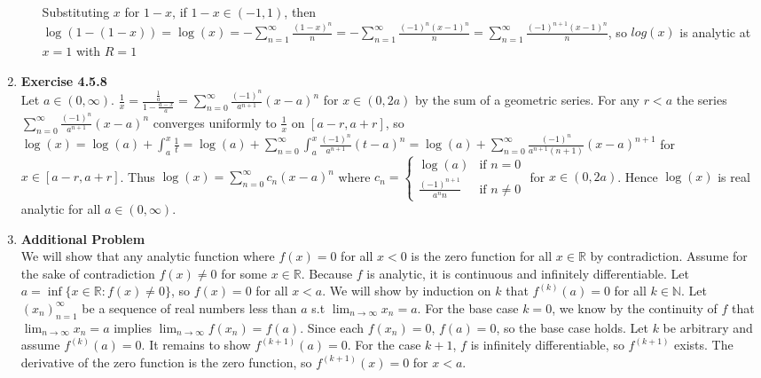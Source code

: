 \documentclass[10pt]{article}
\begin{document}
\begin{enumerate}[label=Problem \arabic*.]
\begin{itemize}
        Substituting $x$ for $1-x$, if $1-x\in(-1,1)$, then $\displaystyle \log(1-(1-x))=\log(x)=-\sum_{n=1}^{\infty}\frac{(1-x)^n}{n}=-\sum_{n=1}^{\infty}\frac{(-1)^n(x-1)^n}{n}=\sum_{n=1}^{\infty}\frac{(-1)^{n+1}(x-1)^n}{n}$, so $log(x)$ is analytic at $x=1$ with $R=1$
    \end{itemize}
    \item \textbf{Exercise 4.5.8}\\
    Let $a\in(0,\infty)$.
    $\displaystyle\frac{1}{x}=\frac{\frac{1}{a}}{1-\frac{a-x}{a}}=\sum_{n=0}^{\infty}\frac{(-1)^n}{a^{n+1}}(x-a)^n$ for $x\in(0,2a)$ by the sum of a geometric series.
    For any $r<a$ the series $\displaystyle\sum_{n=0}^{\infty}\frac{(-1)^n}{a^{n+1}}(x-a)^n$ converges uniformly to $\frac{1}{x}$ on $[a-r,a+r]$, 
    so $\displaystyle\log(x)=\log(a)+\int_{a}^{x}\frac{1}{t}=\log(a)+\sum_{n=0}^{\infty}\int_{a}^{x}\frac{(-1)^n}{a^{n+1}}(t-a)^n=\log(a)+\sum_{n=0}^{\infty}\frac{(-1)^n}{a^{n+1}(n+1)}(x-a)^{n+1}$ for $x\in[a-r,a+r]$.
    Thus $\displaystyle\log(x)=\sum_{n=0}^{\infty}c_n(x-a)^n$ where $c_n=
    \begin{cases}
        \log(a) & \text{if } n=0\\
        \frac{(-1)^{n+1}}{a^nn} & \text{if } n\neq0    
    \end{cases}
    $ for $x\in(0,2a)$.
    Hence $\log(x)$ is real analytic for all $a\in(0,\infty)$.
    \item \textbf{Additional Problem}\\
    We will show that any analytic function where $f(x)=0$ for all $x<0$ is the zero function for all $x\in\mathbb{R}$ by contradiction.
    Assume for the sake of contradiction $f(x)\neq0$ for some $x\in\mathbb{R}$.
    Because $f$ is analytic, it is continuous and infinitely differentiable.
    Let $a=\inf\{x\in\mathbb{R}:f(x)\neq0\}$, so $f(x)=0$ for all $x<a$.
    We will show by induction on $k$ that $f^{(k)}(a)=0$ for all $k\in\mathbb{N}$.
    Let $(x_n)_{n=1}^{\infty}$ be a sequence of real numbers less than $a$ s.t $\displaystyle\lim_{n\rightarrow\infty}x_n=a$.
    For the base case $k=0$, we know by the continuity of $f$ that $\displaystyle\lim_{n\rightarrow\infty}x_n=a$ implies $\displaystyle\lim_{n\rightarrow\infty}f(x_n)=f(a)$. 
    Since each $f(x_n)=0$, $f(a)=0$, so the base case holds. 
    Let $k$ be arbitrary and assume $f^{(k)}(a)=0$. It remains to show $f^{(k+1)}(a)=0$.
    For the case $k+1$, $f$ is infinitely differentiable, so $f^{(k+1)}$ exists. 
    The derivative of the zero function is the zero function, so $f^{(k+1)}(x)=0$ for $x<a$. 

\end{enumerate}
\end{document}
